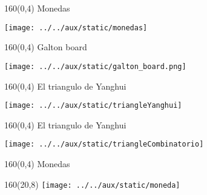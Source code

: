 \documentclass[shownotes,aspectratio=169]{beamer}
\begin{document}
\begin{frame}[plain]
 \begin{textblock}{160}(0,4)
  \centering \LARGE Monedas
 \end{textblock}

 \vspace{1cm}

\texttt{[image: ../../aux/static/monedas]} 
 
\end{frame}

\begin{frame}[plain]
 \begin{textblock}{160}(0,4)
  \centering \LARGE Galton board
 \end{textblock}

 \vspace{1cm}

 \centering
\texttt{[image: ../../aux/static/galton\_board.png]} 
 
\end{frame}

\begin{frame}[plain]
 \begin{textblock}{160}(0,4)
  \centering \LARGE El triangulo de Yanghui
 \end{textblock}

\vspace{1cm}

\centering
\texttt{[image: ../../aux/static/triangleYanghui]}

\end{frame}

\begin{frame}[plain]
 \begin{textblock}{160}(0,4)
  \centering \LARGE El triangulo de Yanghui
 \end{textblock}

\vspace{1cm}

\centering
\texttt{[image: ../../aux/static/triangleCombinatorio]}

 
\end{frame}


\begin{frame}[plain]
 \begin{textblock}{160}(0,4)
  \centering \LARGE Monedas
 \end{textblock}

 \begin{textblock}{160}(20,8)
\texttt{[image: ../../aux/static/moneda]}  
 \end{textblock}

\end{frame}
\end{document}
